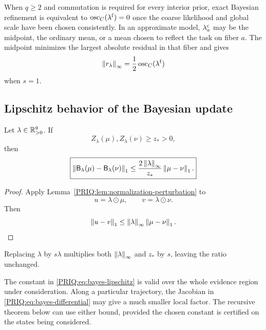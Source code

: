 When $q\geq2$ and commutation is required for every interior prior, exact Bayesian refinement is equivalent to $\operatorname{osc}_C(\lambda^{\mathrm f})=0$ once the coarse likelihood and global scale have been chosen consistently.  In an approximate model, $\lambda_a^{\mathrm c}$ may be the midpoint, the ordinary mean, or a mean chosen to reflect the task on fiber $a$.  The midpoint minimizes the largest absolute residual in that fiber and gives
\[
  \left\lVert r_{\lambda}\right\rVert_{\infty}
  =\frac12\operatorname{osc}_C(\lambda^{\mathrm f})
\]
when $s=1$.

\subsection{Lipschitz behavior of the Bayesian update}

\begin{PRIQproposition}\label{PRIQ:prop:bayes-lipschitz}
Let $\lambda\in\mathbb R_{>0}^q$.  If
\[
  Z_{\lambda}(\mu),Z_{\lambda}(\nu)\geq z_*>0,
\]
then
\begin{equation}\label{PRIQ:eq:bayes-lipschitz}
  \boxed{
  \left\lVert \mathsf B_{\lambda}(\mu)-\mathsf B_{\lambda}(\nu)\right\rVert_1
  \leq
  \frac{2\left\lVert \lambda\right\rVert_{\infty}}{z_*}
  \left\lVert \mu-\nu\right\rVert_1.}
\end{equation}
\end{PRIQproposition}

\begin{proof}
Apply Lemma~\ref{PRIQ:lem:normalization-perturbation} to
\[
  u=\lambda\odot\mu,
  \qquad
  v=\lambda\odot\nu.
\]
Then
\[
  \left\lVert u-v\right\rVert_1
  \leq\left\lVert \lambda\right\rVert_{\infty}\left\lVert \mu-\nu\right\rVert_1.
\]
\end{proof}

\begin{PRIQremark}
Replacing $\lambda$ by $s\lambda$ multiplies both $\left\lVert \lambda\right\rVert_{\infty}$ and $z_*$ by $s$, leaving the ratio unchanged.
\end{PRIQremark}

\begin{PRIQremark}
The constant in \eqref{PRIQ:eq:bayes-lipschitz} is valid over the whole evidence region under consideration.  Along a particular trajectory, the Jacobian in \eqref{PRIQ:eq:bayes-differential} may give a much smaller local factor.  The recursive theorem below can use either bound, provided the chosen constant is certified on the states being considered.
\end{PRIQremark}



